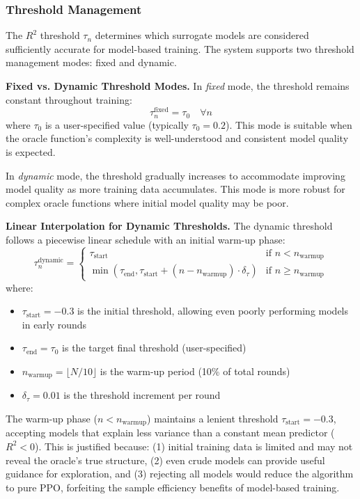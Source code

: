 \subsubsection{Threshold Management}

The $R^2$ threshold $\tau_n$ determines which surrogate models are considered sufficiently accurate for model-based training. The system supports two threshold management modes: fixed and dynamic.

\textbf{Fixed vs. Dynamic Threshold Modes.} In \emph{fixed} mode, the threshold remains constant throughout training:
%
\begin{equation}
\tau_n^{\text{fixed}} = \tau_0 \quad \forall n
\end{equation}
%
where $\tau_0$ is a user-specified value (typically $\tau_0 = 0.2$). This mode is suitable when the oracle function's complexity is well-understood and consistent model quality is expected.

In \emph{dynamic} mode, the threshold gradually increases to accommodate improving model quality as more training data accumulates. This mode is more robust for complex oracle functions where initial model quality may be poor.

\textbf{Linear Interpolation for Dynamic Thresholds.} The dynamic threshold follows a piecewise linear schedule with an initial warm-up phase:
%
\begin{equation}
\tau_n^{\text{dynamic}} = \begin{cases}
\tau_{\text{start}} & \text{if } n < n_{\text{warmup}} \\
\min\left(\tau_{\text{end}}, \tau_{\text{start}} + (n - n_{\text{warmup}}) \cdot \delta_{\tau}\right) & \text{if } n \geq n_{\text{warmup}}
\end{cases}
\end{equation}
%
where:
\begin{itemize}
    \item $\tau_{\text{start}} = -0.3$ is the initial threshold, allowing even poorly performing models in early rounds
    \item $\tau_{\text{end}} = \tau_0$ is the target final threshold (user-specified)
    \item $n_{\text{warmup}} = \lfloor N/10 \rfloor$ is the warm-up period (10\% of total rounds)
    \item $\delta_{\tau} = 0.01$ is the threshold increment per round
\end{itemize}

The warm-up phase ($n < n_{\text{warmup}}$) maintains a lenient threshold $\tau_{\text{start}} = -0.3$, accepting models that explain less variance than a constant mean predictor ($R^2 < 0$). This is justified because: (1) initial training data is limited and may not reveal the oracle's true structure, (2) even crude models can provide useful guidance for exploration, and (3) rejecting all models would reduce the algorithm to pure PPO, forfeiting the sample efficiency benefits of model-based training.

